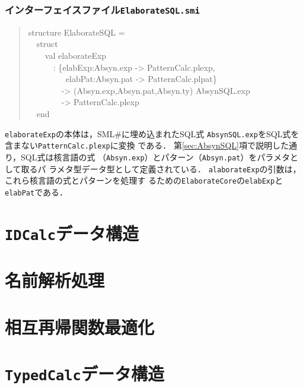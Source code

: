 \documentclass{jbook}
\newcommand{\txt}[2]{#1}
\newcommand{\smlsharp}{SML\#}
\newcommand{\code}[1]{\mbox{\large\tt #1}}
\newcommand{\myem}{\mbox{\ \ }}
\newenvironment{program}{\begin{quote}\begin{tt}}%
                        {\end{tt}\end{quote}}
\begin{document}
\subsection{インターフェイスファイル\code{ElaborateSQL.smi}}
\begin{program}
structure ElaborateSQL =\\
\myem  struct\\
\myem\myem     val elaborateExp\\
\myem\myem\myem   : \{elabExp:Absyn.exp -> PatternCalc.plexp,\\
\myem\myem\myem\myem\  elabPat:Absyn.pat -> PatternCalc.plpat\}\\
\myem\myem\myem\myem  -> (Absyn.exp,Absyn.pat,Absyn.ty) AbsynSQL.exp\\
\myem\myem\myem\myem  -> PatternCalc.plexp\\
\myem  end
\end{program}
	\code{elaborateExp}の本体は，\smlsharp{}に埋め込まれたSQL式
\code{AbsynSQL.exp}をSQL式を含まない\code{PatternCalc.plexp}に変換
である．
	第\ref{sec:AbsynSQL}項で説明した通り，SQL式は核言語の式
（\code{Absyn.exp}）とパターン（\code{Absyn.pat}）をパラメタとして取るパ
ラメタ型データ型として定義されている．
	\code{alaborateExp}の引数は，これら核言語の式とパターンを処理す
るための\code{ElaborateCore}の\code{elabExp}と\code{elabPat}である．


\else%
\fi%


% 
\chapter{\txt
{\code{IDCalc}データ構造}
{The \code{IDCalc} data structure}
}
\label{chap:IDCalc}

\chapter{\txt
{名前解析処理}
{Name Evaluation}
}
\label{chap:nameevaluation}

\chapter{\txt
{相互再帰関数最適化}
{Mutual recursive function optimization}
}
\label{chap:valrecoptimize}

\chapter{\txt
{\code{TypedCalc}データ構造}
{The \code{TypedCalc} data structure}
}
\label{chap:TypedCalc}
\end{document}
